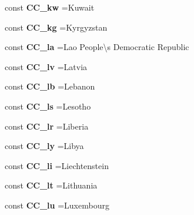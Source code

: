 \begin{DoxyCompactItemize}
const {\bfseries C\+C\+\_\+kw} =\textquotesingle{}Kuwait\textquotesingle{}
\item 
\hypertarget{class_i_s_o_a97b5199c89ad028e9a2c3c0f8d328b9d}{}\label{class_i_s_o_a97b5199c89ad028e9a2c3c0f8d328b9d} 
const {\bfseries C\+C\+\_\+kg} =\textquotesingle{}Kyrgyzstan\textquotesingle{}
\item 
\hypertarget{class_i_s_o_a6ffb30725328fd2a69d63e19b8ca4b7e}{}\label{class_i_s_o_a6ffb30725328fd2a69d63e19b8ca4b7e} 
const {\bfseries C\+C\+\_\+la} =\textquotesingle{}Lao People\textbackslash{}\textquotesingle{}s Democratic Republic\textquotesingle{}
\item 
\hypertarget{class_i_s_o_a919ba7cbb635e11ee1097e7b811b849f}{}\label{class_i_s_o_a919ba7cbb635e11ee1097e7b811b849f} 
const {\bfseries C\+C\+\_\+lv} =\textquotesingle{}Latvia\textquotesingle{}
\item 
\hypertarget{class_i_s_o_a62279c7673eae7074fefbdf62a8a8571}{}\label{class_i_s_o_a62279c7673eae7074fefbdf62a8a8571} 
const {\bfseries C\+C\+\_\+lb} =\textquotesingle{}Lebanon\textquotesingle{}
\item 
\hypertarget{class_i_s_o_aca0c020dcc45eef212feb55cb867f834}{}\label{class_i_s_o_aca0c020dcc45eef212feb55cb867f834} 
const {\bfseries C\+C\+\_\+ls} =\textquotesingle{}Lesotho\textquotesingle{}
\item 
\hypertarget{class_i_s_o_a1d92d9ee0df8c10ea3df4d5464454bd6}{}\label{class_i_s_o_a1d92d9ee0df8c10ea3df4d5464454bd6} 
const {\bfseries C\+C\+\_\+lr} =\textquotesingle{}Liberia\textquotesingle{}
\item 
\hypertarget{class_i_s_o_ae70ddb13e9fc5c0a82fc424ada2f54e9}{}\label{class_i_s_o_ae70ddb13e9fc5c0a82fc424ada2f54e9} 
const {\bfseries C\+C\+\_\+ly} =\textquotesingle{}Libya\textquotesingle{}
\item 
\hypertarget{class_i_s_o_a74c25f934de38177a1f8bcb0555c87d9}{}\label{class_i_s_o_a74c25f934de38177a1f8bcb0555c87d9} 
const {\bfseries C\+C\+\_\+li} =\textquotesingle{}Liechtenstein\textquotesingle{}
\item 
\hypertarget{class_i_s_o_a302e87973f8b1b58f87c8d8a2ef693ff}{}\label{class_i_s_o_a302e87973f8b1b58f87c8d8a2ef693ff} 
const {\bfseries C\+C\+\_\+lt} =\textquotesingle{}Lithuania\textquotesingle{}
\item 
\hypertarget{class_i_s_o_ab2664f05d83f75de35fbde8c5c9a9bad}{}\label{class_i_s_o_ab2664f05d83f75de35fbde8c5c9a9bad} 
const {\bfseries C\+C\+\_\+lu} =\textquotesingle{}Luxembourg\textquotesingle{}
\item 
\hypertarget{class_i_s_o_a97f70c477204fe24a7ead9f550e3dda4}{}\label{class_i_s_o_a97f70c477204fe24a7ead9f550e3dda4} 

\end{DoxyCompactItemize}
